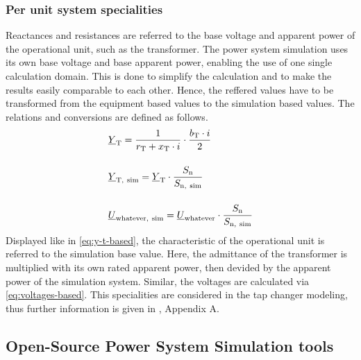 \subsubsection*{Per unit system specialities}

Reactances and resistances are referred to the base voltage and apparent power of the operational unit, such as the transformer. The power system simulation uses its own base voltage and base apparent power, enabling the use of one single calculation domain. This is done to simplify the calculation and to make the results easily comparable to each other. Hence, the reffered values have to be transformed from the equipment based values to the simulation based values. The relations and conversions are defined as follows.
\begin{align}
    &\underline{Y}_\mathrm{T}=\frac{1}{r_\mathrm{T} + x_\mathrm{T} \cdot i} \cdot \frac{b_\mathrm{T} \cdot i}{2} \notag \\[12pt]
    &\underline{Y}_\mathrm{T,~sim}=\underline{Y}_\mathrm{T} \cdot \frac{S_\mathrm{n}}{S_\mathrm{n,~sim}} \label{eq:y-t-based} \\[12pt]
    &\underline{U}_\mathrm{whatever,~sim}=\underline{U}_\mathrm{whatever} \cdot \frac{S_\mathrm{n}}{S_\mathrm{n,~sim}} \label{eq:voltages-based}
\end{align}
Displayed like in \autoref{eq:y-t-based}, the characteristic of the operational unit is referred to the simulation base value. Here, the admittance of the transformer is multiplied with its own rated apparent power, then devided by the apparent power of the simulation system. Similar, the voltages are calculated via \autoref{eq:voltages-based}. This specialities are considered in the tap changer modeling, thus further information is given in \autocite{machowskiPowerSystemDynamics2020}, Appendix A.


\subsection{Open-Source Power System Simulation tools}
    
